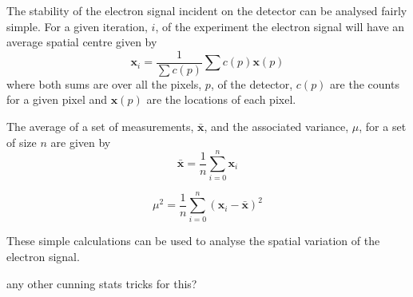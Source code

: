 The stability of the electron signal incident on the detector can be analysed fairly simple. For a given iteration, $i$, of the experiment the electron signal will have an average spatial centre given by
\begin{equation}\label{eq:weight_average_spatial}
\boldsymbol{x}_i = \frac{1}{\sum c(p)} \sum c(p) \boldsymbol x(p)
\end{equation}
where both sums are over all the pixels, $p$, of the detector, $c(p)$ are the counts for a given pixel and $\boldsymbol x(p)$ are the locations of each pixel.

The average of a set of measurements, $\bar{\boldsymbol{x}}$, and the associated variance, $\mu$, for a set of size $n$ are given by
\begin{equation}\label{eq:average_spatial}
\bar{\boldsymbol{x}} = \frac{1}{n} \sum_{i=0}^{n} \boldsymbol{x}_i
\end{equation}

\begin{equation}\label{eq:variance}
\mu^2 = \frac{1}{n} \sum_{i=0}^{n} (\boldsymbol{x}_i - \bar{\boldsymbol{x}})^2
\end{equation}

These simple calculations can be used to analyse the spatial variation of the electron signal.

{\color{red} any other cunning stats tricks for this?}
